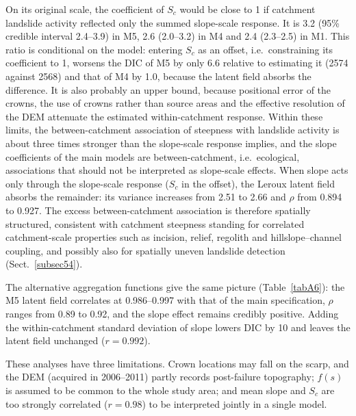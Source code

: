 \documentclass[journal abbreviation, manuscript]{copernicus}
\begin{document}
On its original scale, the coefficient of $S_c$ would be close to 1 if catchment landslide activity reflected only the summed slope-scale response. It is 3.2 (95\% credible interval 2.4--3.9) in M5, 2.6 (2.0--3.2) in M4 and 2.4 (2.3--2.5) in M1. This ratio is conditional on the model: entering $S_c$ as an offset, i.e.~constraining its coefficient to 1, worsens the DIC of M5 by only 6.6 relative to estimating it (2574 against 2568) and that of M4 by 1.0, because the latent field absorbs the difference. It is also probably an upper bound, because positional error of the crowns, the use of crowns rather than source areas and the effective resolution of the DEM attenuate the estimated within-catchment response. Within these limits, the between-catchment association of steepness with landslide activity is about three times stronger than the slope-scale response implies, and the slope coefficients of the main models are between-catchment, i.e.\ ecological, associations that should not be interpreted as slope-scale effects. When slope acts only through the slope-scale response ($S_c$ in the offset), the Leroux latent field absorbs the remainder: its variance increases from 2.51 to 2.66 and $\rho$ from 0.894 to 0.927. The excess between-catchment association is therefore spatially structured, consistent with catchment steepness standing for correlated catchment-scale properties such as incision, relief, regolith and hillslope--channel coupling, and possibly also for spatially uneven landslide detection (Sect.~\ref{subsec54}).

The alternative aggregation functions give the same picture (Table~\ref{tabA6}): the M5 latent field correlates at 0.986--0.997 with that of the main specification, $\rho$ ranges from 0.89 to 0.92, and the slope effect remains credibly positive. Adding the within-catchment standard deviation of slope lowers DIC by 10 and leaves the latent field unchanged ($r = 0.992$).

These analyses have three limitations. Crown locations may fall on the scarp, and the DEM (acquired in 2006--2011) partly records post-failure topography; $f(s)$ is assumed to be common to the whole study area; and mean slope and $S_c$ are too strongly correlated ($r = 0.98$) to be interpreted jointly in a single model.
\end{document}
